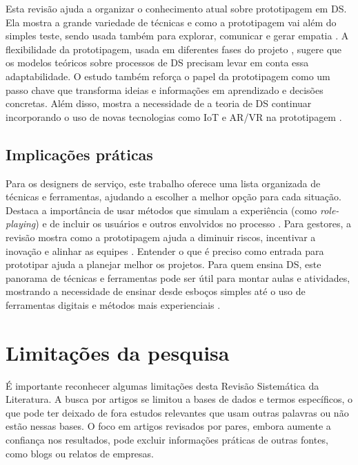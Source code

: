 Esta revisão ajuda a organizar o conhecimento atual sobre prototipagem em DS. Ela mostra a grande variedade de técnicas e como a prototipagem vai além do simples teste, sendo usada também para explorar, comunicar e gerar empatia \cite{soto2023prototyping, paust2025integrative}. A flexibilidade da prototipagem, usada em diferentes fases do projeto \cite{paust2025integrative, mager2023product}, sugere que os modelos teóricos sobre processos de DS precisam levar em conta essa adaptabilidade. O estudo também reforça o papel da prototipagem como um passo chave que transforma ideias e informações em aprendizado e decisões concretas. Além disso, mostra a necessidade de a teoria de DS continuar incorporando o uso de novas tecnologias como IoT e AR/VR na prototipagem \cite{Kim2024, giraldo2024ecotourism}.

\subsection{Implicações práticas}

Para os designers de serviço, este trabalho oferece uma lista organizada de técnicas e ferramentas, ajudando a escolher a melhor opção para cada situação. Destaca a importância de usar métodos que simulam a experiência (como \textit{role-playing}) e de incluir os usuários e outros envolvidos no processo \cite{seko2024transitions, asbjornsen2022echange}. Para gestores, a revisão mostra como a prototipagem ajuda a diminuir riscos, incentivar a inovação e alinhar as equipes \cite{paust2025integrative, iriarte2023service}. Entender o que é preciso como entrada para prototipar ajuda a planejar melhor os projetos. Para quem ensina DS, este panorama de técnicas e ferramentas pode ser útil para montar aulas e atividades, mostrando a necessidade de ensinar desde esboços simples até o uso de ferramentas digitais e métodos mais experienciais \cite{Kim2024, mager2023product}.

\section{Limitações da pesquisa}

É importante reconhecer algumas limitações desta Revisão Sistemática da Literatura. A busca por artigos se limitou a bases de dados e termos específicos, o que pode ter deixado de fora estudos relevantes que usam outras palavras ou não estão nessas bases. O foco em artigos revisados por pares, embora aumente a confiança nos resultados, pode excluir informações práticas de outras fontes, como blogs ou relatos de empresas.

